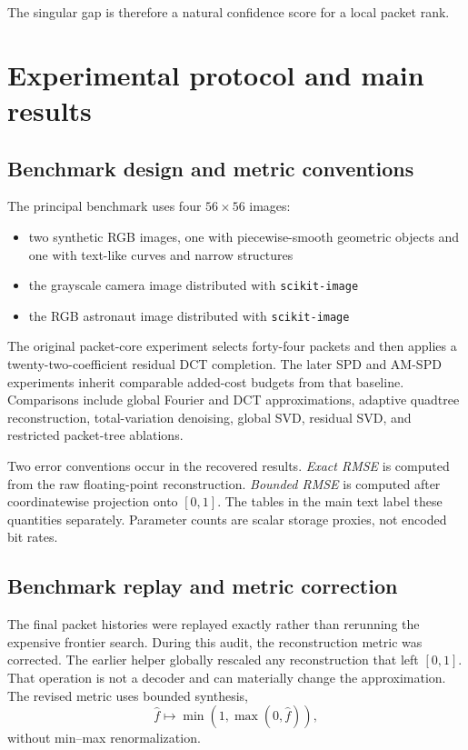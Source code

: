 \documentclass[11pt]{article}
\theoremstyle{definition}
\theoremstyle{remark}
\begin{document}
The singular gap is therefore a natural confidence score for a local packet rank.

\FloatBarrier
\FloatBarrier
\section{Experimental protocol and main results}\label{sec:final-results}
\subsection{Benchmark design and metric conventions}
The principal benchmark uses four $56\times56$ images:
\begin{itemize}
\item two synthetic RGB images, one with piecewise-smooth geometric objects and one with text-like curves and narrow structures
\item the grayscale camera image distributed with \texttt{scikit-image}
\item the RGB astronaut image distributed with \texttt{scikit-image} \cite{ScikitImage}
\end{itemize}

The original packet-core experiment selects forty-four packets and then applies a twenty-two-coefficient residual DCT completion. The later SPD and AM-SPD experiments inherit comparable added-cost budgets from that baseline. Comparisons include global Fourier and DCT approximations, adaptive quadtree reconstruction, total-variation denoising, global SVD, residual SVD, and restricted packet-tree ablations.

Two error conventions occur in the recovered results. \emph{Exact RMSE} is computed from the raw floating-point reconstruction. \emph{Bounded RMSE} is computed after coordinatewise projection onto $[0,1]$. The tables in the main text label these quantities separately. Parameter counts are scalar storage proxies, not encoded bit rates.

\FloatBarrier
\subsection{Benchmark replay and metric correction}
The final packet histories were replayed exactly rather than rerunning the expensive frontier search. During this audit, the reconstruction metric was corrected. The earlier helper globally rescaled any reconstruction that left $[0,1]$. That operation is not a decoder and can materially change the approximation. The revised metric uses bounded synthesis,
\[
\widehat f\longmapsto\min(1,\max(0,\widehat f)),
\]
without min--max renormalization.
\end{document}
